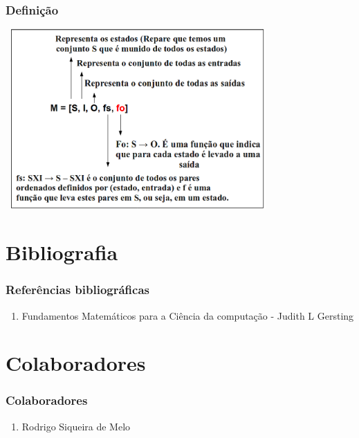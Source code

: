 \documentclass{beamer}
\begin{document}
  \begin{frame}
   \frametitle{Definição}
       \includegraphics[height=2.7in, width=4in]{entendendo_definicao_6.png}
  \end{frame}

\section{Bibliografia}
\begin{frame}
 \frametitle{Referências bibliográficas}
 \begin{enumerate}
  \item Fundamentos Matemáticos para a Ciência da computação - Judith L Gersting
 \end{enumerate}
\end{frame}

\section{Colaboradores}
\begin{frame}
 \frametitle{Colaboradores}
 \begin{enumerate}
  \item Rodrigo Siqueira de Melo
 \end{enumerate}
\end{frame}
\end{document}
